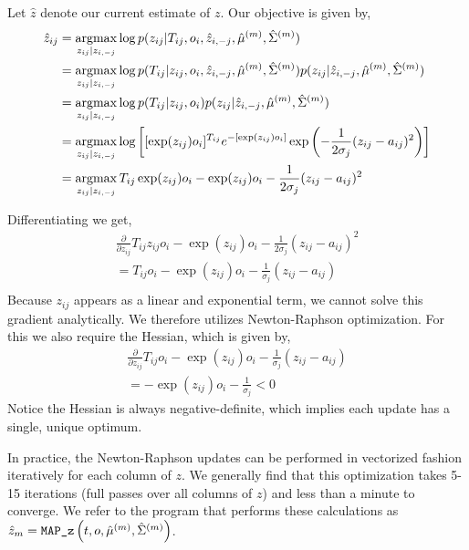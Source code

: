 \documentclass[10pt]{article}
\newcommand{\argmax}{\operatornamewithlimits{argmax}}
\begin{document}
Let $\hat{z}$ denote our current estimate of $z$. Our objective is given by,
\begin{align*}
\hat{z}_{ij} & = \argmax_{z_{ij} | z_{i,-j}} \log p(z_{ij} | T_{ij}, o_i, \hat{z}_{i,-j}, \hat{\mu}^{(m)}, \hat{\Sigma}^{(m)}) \\
& = \argmax_{z_{ij} | z_{i,-j} } \log p(T_{ij} | z_{ij},  o_i, \hat{z}_{i,-j}, \hat{\mu}^{(m)}, \hat{\Sigma}^{(m)})p(z_{ij} | \hat{z}_{i,-j}, \hat{\mu}^{(m)}, \hat{\Sigma}^{(m)})  \\
& = \argmax_{z_{ij} | z_{i,-j} } \log p(T_{ij} | z_{ij}, o_i)p(z_{ij} | \hat{z}_{i,-j}, \hat{\mu}^{(m)}, \hat{\Sigma}^{(m)})  \\
& = \argmax_{z_{ij} | z_{i,-j} } \log \left[ [\exp(z_{ij})o_i]^{T_{ij}}  e^{-[\exp(z_{ij})o_i]} \exp \left( -\frac{1}{2\sigma_j}(z_{ij} - a_{ij})^2 \right) \right] \\
& = \argmax_{z_{ij} | z_{i,-j} }  T_{ij}\exp(z_{ij})o_i -\exp(z_{ij})o_i  -\frac{1}{2\sigma_j}(z_{ij} - a_{ij})^2 
\end{align*}

Differentiating we get,
\begin{align*}
\frac{\partial}{\partial z_{ij}}  T_{ij}z_{ij}o_i - \exp(z_{ij})o_i  -\frac{1}{2\sigma_j}(z_{ij} - a_{ij})^2 \\ 
= T_{ij}o_i - \exp(z_{ij})o_i  -\frac{1}{\sigma_j}(z_{ij} - a_{ij}) \\ 
\end{align*}
Because $z_{ij}$ appears as a linear and exponential term, we cannot solve this gradient analytically. We therefore utilizes Newton-Raphson optimization. For this we also require the Hessian, which is given by,  
\begin{align*}
\frac{\partial}{\partial z_{ij}} T_{ij}o_i - \exp(z_{ij})o_i  -\frac{1}{\sigma_j}(z_{ij} - a_{ij}) \\ 
=  -\exp(z_{ij})o_i  - \frac{1}{\sigma_j} < 0
\end{align*}
Notice the Hessian is always negative-definite, which implies each update has a single, unique optimum. 

In practice, the Newton-Raphson updates can be performed in vectorized fashion iteratively for each column of $z$. We generally find that this optimization takes 5-15 iterations (full passes over all columns of $z$) and less than a minute to converge.  We refer to the program that performs these calculations as $\hat{z}_m = \verb|MAP_z| \left(t, o, \hat{\mu}^{(m)}, \hat{\Sigma}^{(m)} \right)$.
\end{document}

